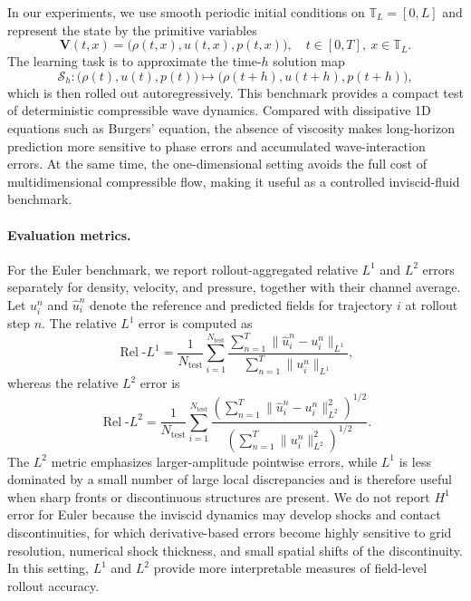 \documentclass[11pt]{article}
\begin{document}
In our experiments, we use smooth periodic initial conditions on $\mathbb{T}_L=[0,L]$ and represent the state by the primitive variables
\begin{equation}
    \mathbf{V}(t,x) = \bigl(\rho(t,x), u(t,x), p(t,x)\bigr),\quad t\in [0,T],\ x\in\mathbb{T}_L.
\end{equation}
The learning task is to approximate the time-$h$ solution map
\begin{equation}
    \mathcal{S}_{h}:
    \bigl(\rho(t),u(t),p(t)\bigr)
    \mapsto
    \bigl(\rho(t+h),u(t+h),p(t+h)\bigr),
    \label{eq:euler1d_solution_map}
\end{equation}
which is then rolled out autoregressively. This benchmark provides a compact test of deterministic compressible wave dynamics. Compared with dissipative 1D equations such as Burgers' equation, the absence of viscosity makes long-horizon prediction more sensitive to phase errors and accumulated wave-interaction errors. At the same time, the one-dimensional setting avoids the full cost of multidimensional compressible flow, making it useful as a controlled inviscid-fluid benchmark.

\paragraph{Evaluation metrics.} For the Euler benchmark, we report rollout-aggregated relative $L^1$ and $L^2$ errors separately for density, velocity, and pressure, together with their channel average. Let $u_i^n$ and $\widehat u_i^n$ denote the reference and predicted fields for trajectory $i$ at rollout step $n$. The relative $L^1$ error is computed as
\[
    \operatorname{Rel}\text{-}L^1
    =
    \frac{1}{N_{\mathrm{test}}}
    \sum_{i=1}^{N_{\mathrm{test}}}
    \frac{
        \sum_{n=1}^{T}\|\widehat u_i^n-u_i^n\|_{L^1}
    }{
        \sum_{n=1}^{T}\|u_i^n\|_{L^1}
    },
\]
whereas the relative $L^2$ error is
\[
    \operatorname{Rel}\text{-}L^2
    =
    \frac{1}{N_{\mathrm{test}}}
    \sum_{i=1}^{N_{\mathrm{test}}}
    \frac{
        \left(
            \sum_{n=1}^{T}\|\widehat u_i^n-u_i^n\|_{L^2}^2
        \right)^{1/2}
    }{
        \left(
            \sum_{n=1}^{T}\|u_i^n\|_{L^2}^2
        \right)^{1/2}
    }.
\]
The $L^2$ metric emphasizes larger-amplitude pointwise errors, while $L^1$ is less dominated by a small number of large local discrepancies and is therefore useful when sharp fronts or discontinuous structures are present. We do not report $H^1$ error for Euler because the inviscid dynamics may develop shocks and contact discontinuities, for which derivative-based errors become highly sensitive to grid resolution, numerical shock thickness, and small spatial shifts of the discontinuity. In this setting, $L^1$ and $L^2$ provide more interpretable measures of field-level rollout accuracy.
\end{document}
